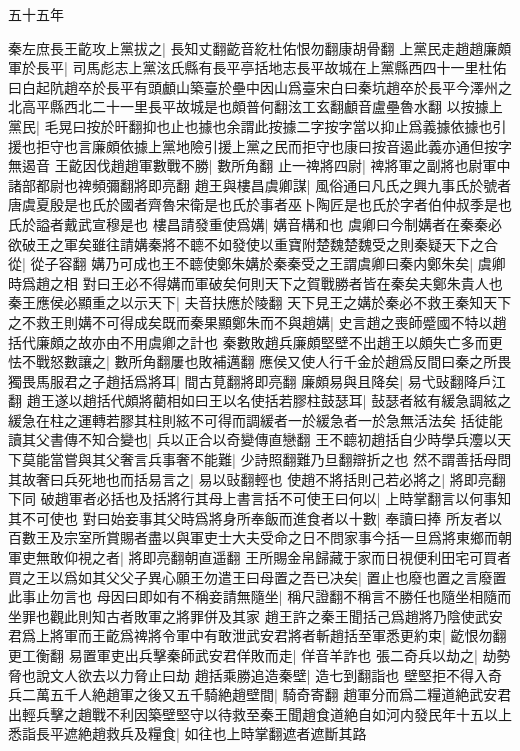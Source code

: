 五十五年

秦左庶長王齕攻上黨拔之|{
	長知丈翻齕音紇杜佑恨勿翻康胡骨翻}
上黨民走趙趙廉頗軍於長平|{
	司馬彪志上黨泫氏縣有長平亭括地志長平故城在上黨縣西四十一里杜佑曰白起阬趙卒於長平有頭顱山築臺於壘中因山爲臺宋白曰秦坑趙卒於長平今澤州之北高平縣西北二十一里長平故城是也頗普何翻泫工玄翻顱音盧壘魯水翻}
以按據上黨民|{
	毛晃曰按於旰翻抑也止也據也余謂此按據二字按字當以抑止爲義據依據也引援也拒守也言廉頗依據上黨地險引援上黨之民而拒守也康曰按音遏此義亦通但按字無遏音}
王齕因伐趙趙軍數戰不勝|{
	數所角翻}
止一禆將四尉|{
	禆將軍之副將也尉軍中諸部都尉也禆頻彌翻將即亮翻}
趙王與樓昌虞卿謀|{
	風俗通曰凡氏之興九事氏於號者唐虞夏殷是也氏於國者齊魯宋衛是也氏於事者巫卜陶匠是也氏於字者伯仲叔季是也氏於謚者戴武宣穆是也}
樓昌請發重使爲媾|{
	媾音構和也}
虞卿曰今制媾者在秦秦必欲破王之軍矣雖往請媾秦將不聼不如發使以重寶附楚魏楚魏受之則秦疑天下之合從|{
	從子容翻}
媾乃可成也王不聼使鄭朱媾於秦秦受之王謂虞卿曰秦内鄭朱矣|{
	虞卿時爲趙之相}
對曰王必不得媾而軍破矣何則天下之賀戰勝者皆在秦矣夫鄭朱貴人也秦王應侯必顯重之以示天下|{
	夫音扶應於陵翻}
天下見王之媾於秦必不救王秦知天下之不救王則媾不可得成矣既而秦果顯鄭朱而不與趙媾|{
	史言趙之喪師蹙國不特以趙括代廉頗之故亦由不用虞卿之計也}
秦數敗趙兵廉頗堅壁不出趙王以頗失亡多而更怯不戰怒數讓之|{
	數所角翻屢也敗補邁翻}
應侯又使人行千金於趙爲反間曰秦之所畏獨畏馬服君之子趙括爲將耳|{
	間古莧翻將即亮翻}
廉頗易與且降矣|{
	易弋䜴翻降戶江翻}
趙王遂以趙括代頗將藺相如曰王以名使括若膠柱鼓瑟耳|{
	鼔瑟者絃有緩急調絃之緩急在柱之運轉若膠其柱則絃不可得而調緩者一於緩急者一於急無活法矣}
括徒能讀其父書傳不知合變也|{
	兵以正合以奇變傳直戀翻}
王不聼初趙括自少時學兵灋以天下莫能當嘗與其父奢言兵事奢不能難|{
	少詩照翻難乃旦翻辯折之也}
然不謂善括母問其故奢曰兵死地也而括易言之|{
	易以䜴翻輕也}
使趙不將括則己若必將之|{
	將即亮翻下同}
破趙軍者必括也及括將行其母上書言括不可使王曰何以|{
	上時掌翻言以何事知其不可使也}
對曰始妾事其父時爲將身所奉飯而進食者以十數|{
	奉讀曰捧}
所友者以百數王及宗室所賞賜者盡以與軍吏士大夫受命之日不問家事今括一旦爲將東鄉而朝軍吏無敢仰視之者|{
	將即亮翻朝直遥翻}
王所賜金帛歸藏于家而日視便利田宅可買者買之王以爲如其父父子異心願王勿遣王曰母置之吾已决矣|{
	置止也廢也置之言廢置此事止勿言也}
母因曰即如有不稱妾請無隨坐|{
	稱尺證翻不稱言不勝任也隨坐相隨而坐罪也觀此則知古者敗軍之將罪併及其家}
趙王許之秦王聞括己爲趙將乃陰使武安君爲上將軍而王齕爲禆將令軍中有敢泄武安君將者斬趙括至軍悉更約束|{
	齕恨勿翻更工衡翻}
易置軍吏出兵擊秦師武安君佯敗而走|{
	佯音羊詐也}
張二奇兵以劫之|{
	劫勢脅也說文人欲去以力脅止曰劫}
趙括乘勝追造秦壁|{
	造七到翻詣也}
壁堅拒不得入奇兵二萬五千人絶趙軍之後又五千騎絶趙壁間|{
	騎奇寄翻}
趙軍分而爲二糧道絶武安君出輕兵擊之趙戰不利因築壁堅守以待救至秦王聞趙食道絶自如河内發民年十五以上悉詣長平遮絶趙救兵及糧食|{
	如往也上時掌翻遮者遮斷其路}
